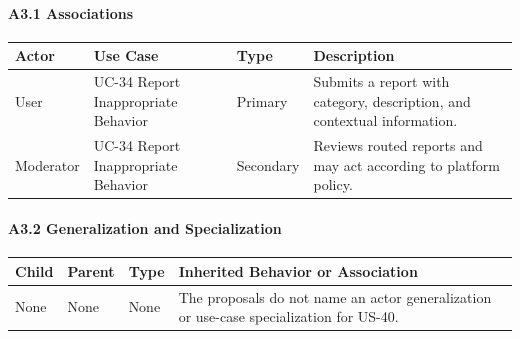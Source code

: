 \documentclass[12pt]{article}
\renewcommand{\baselinestretch}{1.5}
\begin{document}
\hypertarget{sec:a3-1-associations}{}
\paragraph*{A3.1 Associations}
\par\medskip

\begingroup
\small
\renewcommand{\baselinestretch}{1.0}\selectfont
\renewcommand{\arraystretch}{1.15}
\setlength{\tabcolsep}{6pt}
\begin{longtable}{|>{\raggedright\arraybackslash}p{}|>{\raggedright\arraybackslash}p{}|>{\raggedright\arraybackslash}p{}|>{\raggedright\arraybackslash}p{}|}
\hline
\textbf{Actor} & \textbf{Use Case} & \textbf{Type} & \textbf{Description} \\ \hline
\endhead
User & UC-34 Report Inappropriate Behavior & Primary & Submits a report with category, description, and contextual information. \\ \hline
Moderator & UC-34 Report Inappropriate Behavior & Secondary & Reviews routed reports and may act according to platform policy. \\ \hline
\end{longtable}
\endgroup
\par\medskip

\hypertarget{sec:a3-2-generalization-and-specialization}{}
\paragraph*{A3.2 Generalization and Specialization}
\par\medskip

\begingroup
\small
\renewcommand{\baselinestretch}{1.0}\selectfont
\renewcommand{\arraystretch}{1.15}
\setlength{\tabcolsep}{6pt}
\begin{longtable}{|>{\raggedright\arraybackslash}p{}|>{\raggedright\arraybackslash}p{}|>{\raggedright\arraybackslash}p{}|>{\raggedright\arraybackslash}p{}|}
\hline
\textbf{Child} & \textbf{Parent} & \textbf{Type} & \textbf{Inherited Behavior or Association} \\ \hline
\endhead
None & None & None & The proposals do not name an actor generalization or use-case specialization for US-40. \\ \hline
\end{longtable}
\endgroup
\par\medskip

\hypertarget{sec:a3-3-include}{}
\end{document}
